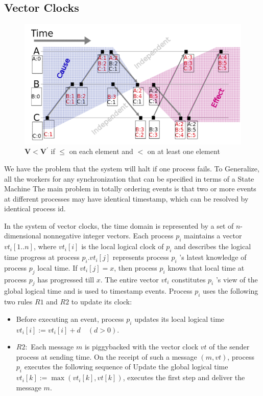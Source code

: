 \documentclass[acmlarge]{acmart}
\begin{document}
\subsection{Vector Clocks}
\begin{figure}[h]
  \centering
  \includegraphics[width=0.5\linewidth]{vec_lock.png}
  \caption{$\mathbf{V}<\mathbf{V}^{\prime}$ if $\leq$ on each element and $<$ on at least one element}
\end{figure}
We have the problem that the system will halt if one process fails. To Generalize, all the workers for any synchronization that can be specified in terms of a State Machine
The main problem in totally ordering events is that two or more events at different processes may have identical timestamp, which can be resolved by identical process id.

In the system of vector clocks, the time domain is represented by a set of $n$-dimensional nonnegative integer vectors. Each process $p_{i}$ maintains a vector $v t_{i}[1 . . n]$, where $v t_{i}[i]$ is the local logical clock of $p_{i}$ and describes the logical time progress at process $p_{i} . v t_{i}[j]$ represents process $p_{i}$ 's latest knowledge of process $p_{j}$ local time. If $v t_{i}[j]=x$, then process $p_{i}$ knows that local time at process $p_{j}$ has progressed till $x$. The entire vector $v t_{i}$ constitutes $p_{i}$ 's view of the global logical time and is used to timestamp events.
Process $p_{i}$ uses the following two rules $R 1$ and $R 2$ to update its clock:

\begin{itemize}
  \item Before executing an event, process $p_{i}$ updates its local logical time $v t_{i}[i]:=v t_{i}[i]+d \quad(d>0)$.
  \item $R 2:$ Each message $m$ is piggybacked with the vector clock $v t$ of the sender process at sending time. On the receipt of such a message $(m, v t)$, process $p_{i}$ executes the following sequence of Update the global logical time $v t_{i}[k]:=\max \left(v t_{i}[k], v t[k]\right)$, executes the first step and deliver the message $m$.
\end{itemize}
\end{document}
